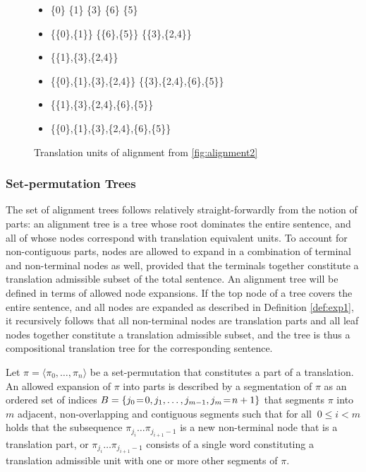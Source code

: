 \begin{figure}[!ht]
\begin{framed}
\small{
\begin{itemize}
\item \{0\} \hfill \{1\} \hfill \{3\} \hfill \{6\} \hfill \{5\} \hfill
\item \{\{0\},\{1\}\} \hfill  \{\{6\},\{5\}\} \hfill \{\{3\},\{2,4\}\}
\item \{\{1\},\{3\},\{2,4\}\}
\item \{\{0\},\{1\},\{3\},\{2,4\}\} \hfill \{\{3\},\{2,4\},\{6\},\{5\}\}
\item \{\{1\},\{3\},\{2,4\},\{6\},\{5\}\}
\item \{\{0\},\{1\},\{3\},\{2,4\},\{6\},\{5\}\}
\end{itemize}
}
\end{framed}
\caption{Translation units of alignment from \ref{fig:alignment2}}\label{fig:transequi}
\end{figure}

\subsubsection{Set-permutation Trees}

The set of alignment trees follows relatively straight-forwardly from the notion of parts: an alignment tree is a tree whose root dominates the entire sentence, and all of whose nodes correspond with translation equivalent units. To account for non-contiguous parts, nodes are allowed to expand in a combination of terminal and non-terminal nodes as well, provided that the terminals together constitute a translation admissible subset of the total sentence. An alignment tree will be defined in terms of allowed node expansions. If the top node of a tree covers the entire sentence, and all nodes are expanded as described in Definition \ref{def:exp1}, it recursively follows that all non-terminal nodes are translation parts and all leaf nodes together constitute a translation admissible subset, and the tree is thus a compositional translation tree for the corresponding sentence.

\begin{definition}\label{def:exp1}
Let $\pi = \langle \pi_0, \ldots,\pi_n\rangle$ be a set-permutation that constitutes a part of a translation. An allowed expansion of $\pi$ into parts is described by a segmentation of $\pi$ as an ordered set of indices $B = \{j_0\negthinspace=\negthinspace 0, j_1, \ldots ,j_{m-1},j_m\negthinspace=\negthinspace n+1\}$ that segments $\pi$ into $m$ adjacent, non-overlapping and contiguous segments such that for all $~0\leq i < m$ holds that the subsequence $\pi_{j_i}\ldots\pi_{j_{i+1}-1}$ is a new non-terminal node that is a translation part, or $\pi_{j_i}\ldots\pi_{j_{i+1}-1}$ consists of a single word constituting a translation admissible unit with one or more other segments of $\pi$.
\end{definition}

